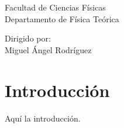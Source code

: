 \documentclass[12pt,a4paper,twoside]{article}
\theoremstyle{definition} \newtheorem{defn}[thm]{Definición}
\theoremstyle{definition} \newtheorem{ejemplo}[thm]{Ejemplo}
\theoremstyle{definition} \newtheorem{ejercicio}[thm]{Ejercicio}
\theoremstyle{remark} \newtheorem*{obs}{Observación}
\begin{document}
\begin{titlepage}
\vfill
\begin{minipage}{0.5\textwidth}

    Facultad de Ciencias Físicas \\
    Departamento de Física Teórica          
 \end{minipage}
 \hfill
\begin{minipage}{0.3\textwidth}
Dirigido por:\\
  Miguel Ángel Rodríguez
  \end{minipage}
\end{titlepage}


\tableofcontents

\section*{Introducción}
Aquí la introducción.
\end{document}
